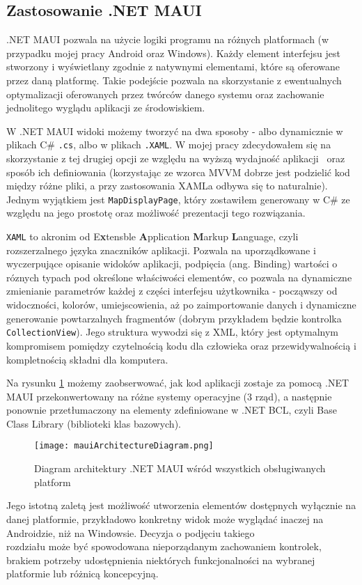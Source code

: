 \subsection{Zastosowanie .NET MAUI}

.NET MAUI pozwala na użycie logiki programu na różnych platformach 
(w przypadku mojej pracy Android oraz Windows).
Każdy element interfejsu jest stworzony i wyświetlany zgodnie z natywnymi elementami, 
które są oferowane przez daną platformę. Takie podejście pozwala na skorzystanie 
z ewentualnych optymalizacji oferowanych przez twórców danego systemu oraz 
zachowanie jednolitego wyglądu aplikacji ze środowiskiem.

W .NET MAUI widoki możemy tworzyć na dwa sposoby - albo dynamicznie w plikach C\# \verb|.cs|, 
albo w plikach \verb|.XAML|. W mojej pracy zdecydowałem się na skorzystanie z tej drugiej opcji 
ze względu na wyższą wydajność aplikacji~\cite{xamlPerformance} oraz sposób ich definiowania 
(korzystając ze wzorca MVVM dobrze jest podzielić kod między różne pliki, 
a przy zastosowania XAMLa odbywa się to naturalnie). Jednym wyjątkiem jest \verb|MapDisplayPage|, 
który zostawiłem generowany w C\# ze względu na jego prostotę oraz możliwość prezentacji tego rozwiązania.

\verb|XAML| to akronim od E\textbf{x}tensble \textbf{A}pplication \textbf{M}arkup \textbf{L}anguage, 
czyli rozszerzalnego języka znaczników aplikacji. Pozwala na uporządkowane i wyczerpujące opisanie 
widoków aplikacji, podpięcia (ang. Binding) wartości o róznych typach pod określone właściwości 
elementów, co pozwala na dynamiczne zmienianie parametrów każdej z części interfejsu użytkownika - 
począwszy od widoczności, kolorów, umiejscowienia, aż po zaimportowanie danych i dynamiczne generowanie 
powtarzalnych fragmentów (dobrym przykładem będzie kontrolka \verb|CollectionView|).
Jego struktura wywodzi się z XML, który jest optymalnym kompromisem pomiędzy czytelnością kodu dla człowieka 
oraz przewidywalnością i kompletnością składni dla komputera.

Na rysunku \ref{img:mauiArchitectureDiagram} możemy zaobserwować, jak kod aplikacji 
zostaje za pomocą .NET MAUI przekonwertowany na różne systemy operacyjne (3 rząd), 
a następnie ponownie przetłumaczony na elementy zdefiniowane w .NET BCL, 
czyli Base Class Library (biblioteki klas bazowych). \\
\newpage
\begin{figure}[ht]
    \centering
    \texttt{[image: mauiArchitectureDiagram.png]}
    \caption{Diagram architektury .NET MAUI wśród wszystkich obsługiwanych platform~\cite{mauiDefinition}}
    \label{img:mauiArchitectureDiagram}
\end{figure}


Jego istotną zaletą jest możliwość utworzenia elementów dostępnych wyłącznie 
na danej platformie, przykładowo konkretny widok może wyglądać inaczej na Androidzie, 
niż na Windowsie. Decyzja o podjęciu takiego \\
rozdziału może być spowodowana nieporządanym zachowaniem kontrolek, 
brakiem potrzeby udostępnienia niektórych funkcjonalności na wybranej\\%
platformie lub różnicą koncepcyjną.
